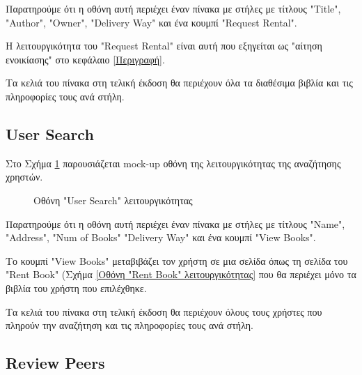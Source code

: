 \documentclass[12pt,a4paper]{article}
\begin{document}
Παρατηρούμε ότι η οθόνη αυτή περιέχει έναν πίνακα με στήλες με τίτλους "Title", "Author", "Owner", "Delivery Way" και ένα κουμπί "Request Rental". 

Η λειτουργικότητα του "Request Rental" είναι αυτή που εξηγείται ως "αίτηση ενοικίασης" στο κεφάλαιο \ref{Περιγραφή}. 

Τα κελιά του πίνακα στη τελική έκδοση θα περιέχουν όλα τα διαθέσιμα βιβλία και τις πληροφορίες τους ανά στήλη.

\subsection{User Search}

Στο Σχήμα \ref{Οθόνη "User Search" λειτουργικότητας} παρουσιάζεται mock-up οθόνη της λειτουργικότητας της αναζήτησης χρηστών.

\begin{figure}[H]
	\caption{Οθόνη "User Search" λειτουργικότητας}
	\label{Οθόνη "User Search" λειτουργικότητας}
\end{figure}

Παρατηρούμε ότι η οθόνη αυτή περιέχει έναν πίνακα με στήλες με τίτλους "Name", "Address", "Num of Books" "Delivery Way" και ένα κουμπί "View Books". 

Το κουμπί "View Books" μεταβιβάζει τον χρήστη σε μια σελίδα όπως τη σελίδα του "Rent Book" (Σχήμα \ref{Οθόνη "Rent Book" λειτουργικότητας} που θα περιέχει μόνο τα βιβλία του χρήστη που επιλέχθηκε.

Τα κελιά του πίνακα στη τελική έκδοση θα περιέχουν όλους τους χρήστες που πληρούν την αναζήτηση και τις πληροφορίες τους ανά στήλη.

\subsection{Review Peers}
\end{document}
